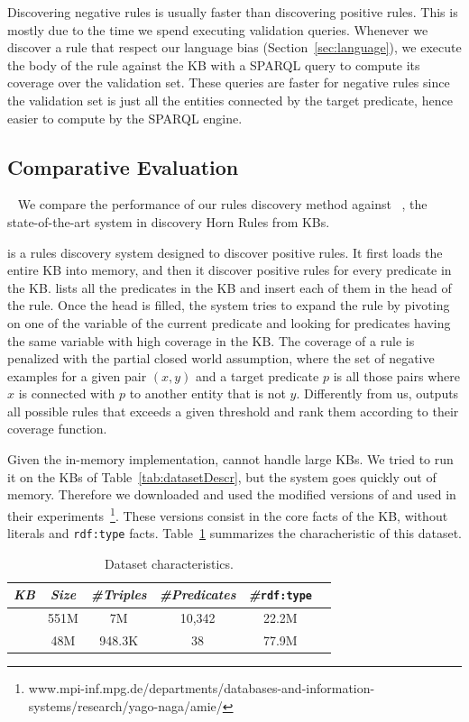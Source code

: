 Discovering negative rules is usually faster than discovering positive rules. This is mostly due to the time we spend executing validation queries. Whenever we discover a rule that respect our language bias (Section~\ref{sec:language}), we execute the body of the rule against the KB with a SPARQL query to compute its coverage over the validation set. These queries are faster for negative rules since the validation set is just all the entities connected by the target predicate, hence easier to compute by the SPARQL engine.


\subsection{Comparative Evaluation} ~\label{sec:comp_evaluation}
We compare the performance of our rules discovery method against \amie~\cite{galarraga2015fast}, the state-of-the-art system in discovery Horn Rules from KBs.

\amie is a rules discovery system designed to discover positive rules. It first loads the entire KB into memory, and then it discover positive rules for every predicate in the KB. \amie lists all the predicates in the KB and insert each of them in the head of the rule. Once the head is filled, the system tries to expand the rule by pivoting on one of the variable of the current predicate and looking for predicates having the same variable with high coverage in the KB. The coverage of  a rule is penalized with the partial closed world assumption, where the set of negative examples for a given pair $(x,y)$ and a target predicate $p$ is all those pairs where $x$ is connected with $p$ to another entity that is not $y$. Differently from us, \amie outputs all possible rules that exceeds a given threshold and rank them according to their coverage function.

Given the in-memory implementation, \amie cannot handle large KBs. We tried to run it on the KBs of Table~\ref{tab:datasetDescr}, but the system goes quickly out of memory. Therefore we downloaded and used the modified versions of \yago and \dbpedia used in their experiments~\footnote{www.mpi-inf.mpg.de/departments/databases-and-information-systems/research/yago-naga/amie/}. These versions consist in the core facts of the KB, without literals and \texttt{rdf:type} facts. Table~\ref{tab:AmieDatasetDescr} summarizes the characheristic of this dataset.

\begin{table}[htb]
	\centering
	\caption{\amie Dataset characteristics.}
	\label{tab:AmieDatasetDescr}
	\begin{small}
		\begin{tabular}{|c|c|c|c|c|c|}
			\hline
			\hline
			{\it KB}&{\it Size}&{\it  \#Triples}&{\it \#Predicates}&{\it \#}\texttt{rdf:type}\tabularnewline
			\hline
			\dbpedia & 551M & 7M & 10,342 & 22.2M \tabularnewline
			\yago & 48M & 948.3K & 38 & 77.9M  \tabularnewline
			\hline
		\end{tabular}
	\end{small}
\end{table}

